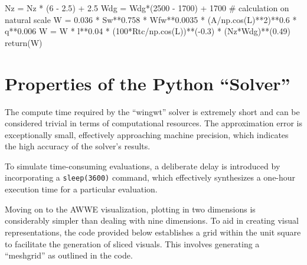 \documentclass[
  letterpaper,
  DIV=11,
  numbers=noendperiod]{scrreprt}
\newenvironment{Shaded}{\begin{snugshade}}{\end{snugshade}}
\newcommand{\CommentTok}[1]{\textcolor[rgb]{0.37,0.37,0.37}{#1}}
\newcommand{\ControlFlowTok}[1]{\textcolor[rgb]{0.00,0.23,0.31}{#1}}
\newcommand{\DecValTok}[1]{\textcolor[rgb]{0.68,0.00,0.00}{#1}}
\newcommand{\FloatTok}[1]{\textcolor[rgb]{0.68,0.00,0.00}{#1}}
\newcommand{\NormalTok}[1]{\textcolor[rgb]{0.00,0.23,0.31}{#1}}
\newcommand{\OperatorTok}[1]{\textcolor[rgb]{0.37,0.37,0.37}{#1}}
\begin{document}
\begin{Shaded}
\begin{Highlighting}[]
\NormalTok{    Nz }\OperatorTok{=}\NormalTok{ Nz }\OperatorTok{*}\NormalTok{ (}\DecValTok{6} \OperatorTok{{-}} \FloatTok{2.5}\NormalTok{) }\OperatorTok{+} \FloatTok{2.5}
\NormalTok{    Wdg }\OperatorTok{=}\NormalTok{ Wdg}\OperatorTok{*}\NormalTok{(}\DecValTok{2500} \OperatorTok{{-}} \DecValTok{1700}\NormalTok{) }\OperatorTok{+} \DecValTok{1700}
    \CommentTok{\# calculation on natural scale}
\NormalTok{    W }\OperatorTok{=} \FloatTok{0.036} \OperatorTok{*}\NormalTok{ Sw}\OperatorTok{**}\FloatTok{0.758} \OperatorTok{*}\NormalTok{ Wfw}\OperatorTok{**}\FloatTok{0.0035} \OperatorTok{*}\NormalTok{ (A}\OperatorTok{/}\NormalTok{np.cos(L)}\OperatorTok{**}\DecValTok{2}\NormalTok{)}\OperatorTok{**}\FloatTok{0.6} \OperatorTok{*}\NormalTok{ q}\OperatorTok{**}\FloatTok{0.006} 
\NormalTok{    W }\OperatorTok{=}\NormalTok{ W }\OperatorTok{*}\NormalTok{ l}\OperatorTok{**}\FloatTok{0.04} \OperatorTok{*}\NormalTok{ (}\DecValTok{100}\OperatorTok{*}\NormalTok{Rtc}\OperatorTok{/}\NormalTok{np.cos(L))}\OperatorTok{**}\NormalTok{(}\OperatorTok{{-}}\FloatTok{0.3}\NormalTok{) }\OperatorTok{*}\NormalTok{ (Nz}\OperatorTok{*}\NormalTok{Wdg)}\OperatorTok{**}\NormalTok{(}\FloatTok{0.49}\NormalTok{)}
    \ControlFlowTok{return}\NormalTok{(W)}
\end{Highlighting}
\end{Shaded}

\section{Properties of the Python
``Solver''}\label{properties-of-the-python-solver}

The compute time required by the ``wingwt'' solver is extremely short
and can be considered trivial in terms of computational resources. The
approximation error is exceptionally small, effectively approaching
machine precision, which indicates the high accuracy of the solver's
results.

To simulate time-consuming evaluations, a deliberate delay is introduced
by incorporating a \texttt{sleep(3600)} command, which effectively
synthesizes a one-hour execution time for a particular evaluation.

Moving on to the AWWE visualization, plotting in two dimensions is
considerably simpler than dealing with nine dimensions. To aid in
creating visual representations, the code provided below establishes a
grid within the unit square to facilitate the generation of sliced
visuals. This involves generating a ``meshgrid'' as outlined in the
code.
\end{document}
